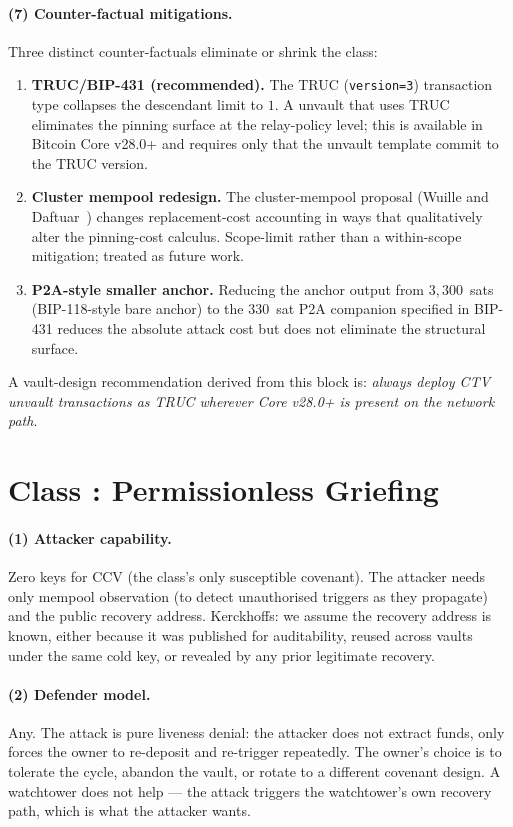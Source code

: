 \paragraph{(7) Counter-factual mitigations.}
Three distinct counter-factuals eliminate or shrink the class:
\begin{enumerate}
\item \textbf{TRUC/BIP-431 (recommended).} The TRUC
  (\texttt{version=3}) transaction type collapses the descendant
  limit to $1$. A \opctv{} unvault that uses TRUC eliminates the
  pinning surface at the relay-policy level; this is available in
  Bitcoin Core v28.0+ and requires only that the unvault template
  commit to the TRUC version.
\item \textbf{Cluster mempool redesign.} The cluster-mempool
  proposal (Wuille and Daftuar~\cite{ClusterMempool}) changes
  replacement-cost accounting in ways that qualitatively alter the
  pinning-cost calculus. Scope-limit rather than a within-scope
  mitigation; treated as future work.
\item \textbf{P2A-style smaller anchor.} Reducing the anchor output
  from $3{,}300$~sats (BIP-118-style bare anchor) to the $330$~sat
  P2A companion specified in BIP-431 reduces the absolute attack
  cost but does not eliminate the structural surface.
\end{enumerate}
A vault-design recommendation derived from this block is:
\emph{always deploy CTV unvault transactions as TRUC wherever Core
v28.0+ is present on the network path}.

\section{Class \classgrief{}: Permissionless Griefing}
\label{app:rat:classgrief}

\paragraph{(1) Attacker capability.}
Zero keys for CCV (the class's only susceptible covenant). The
attacker needs only mempool observation (to detect unauthorised
triggers as they propagate) and the public recovery address.
Kerckhoffs: we assume the recovery address is known, either because
it was published for auditability, reused across vaults under the
same cold key, or revealed by any prior legitimate recovery.

\paragraph{(2) Defender model.}
Any. The attack is pure liveness denial: the attacker does not
extract funds, only forces the owner to re-deposit and re-trigger
repeatedly. The owner's choice is to tolerate the cycle, abandon
the vault, or rotate to a different covenant design. A watchtower
does not help --- the attack triggers the watchtower's own recovery
path, which is what the attacker wants.

